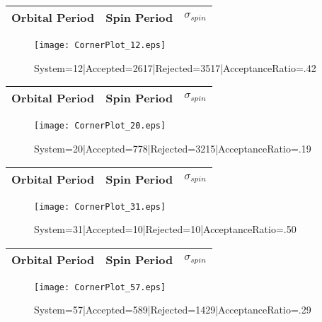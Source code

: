 \documentclass[10pt]{article}
\begin{document}
\begin{center}
        \begin{tabular}{|c|c|c|}
        \hline
Orbital Period & Spin Period & $\sigma_{spin}$ \\
 \hline
        \end{tabular}
        \end{center}
\begin{figure}[h] 
        \texttt{[image: CornerPlot\_12.eps]}
        \caption{System=12|Accepted=2617|Rejected=3517|AcceptanceRatio=.42}
        \label{S12}
        \centering
        \end{figure}
\begin{center}
        \begin{tabular}{|c|c|c|}
        \hline
Orbital Period & Spin Period & $\sigma_{spin}$ \\
 \hline
        \end{tabular}
        \end{center}
\begin{figure}[h] 
        \texttt{[image: CornerPlot\_20.eps]}
        \caption{System=20|Accepted=778|Rejected=3215|AcceptanceRatio=.19}
        \label{S20}
        \centering
        \end{figure}
\begin{center}
        \begin{tabular}{|c|c|c|}
        \hline
Orbital Period & Spin Period & $\sigma_{spin}$ \\
 \hline
        \end{tabular}
        \end{center}
\begin{figure}[h] 
        \texttt{[image: CornerPlot\_31.eps]}
        \caption{System=31|Accepted=10|Rejected=10|AcceptanceRatio=.50}
        \label{S31}
        \centering
        \end{figure}
\begin{center}
        \begin{tabular}{|c|c|c|}
        \hline
Orbital Period & Spin Period & $\sigma_{spin}$ \\
 \hline
        \end{tabular}
        \end{center}
\begin{figure}[h] 
        \texttt{[image: CornerPlot\_57.eps]}
        \caption{System=57|Accepted=589|Rejected=1429|AcceptanceRatio=.29}
        \label{S57}
        \centering
        \end{figure}
\end{document}
